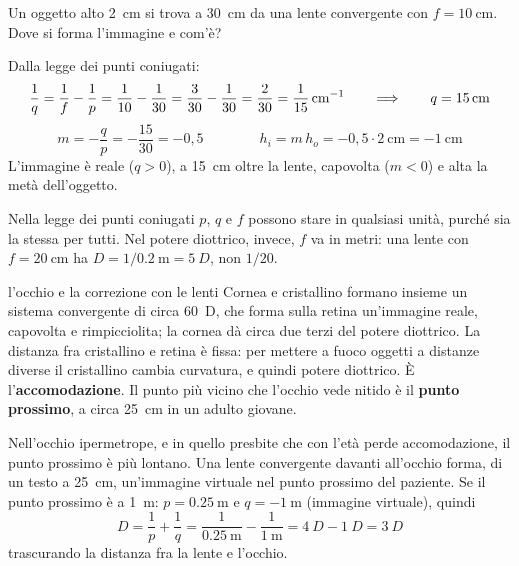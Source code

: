 \begin{esempio}
Un oggetto alto \SI{2}{\centi\metre} si trova a \SI{30}{\centi\metre} da una lente convergente con $f = \SI{10}{\centi\metre}$. Dove si forma l'immagine e com'è?

Dalla legge dei punti coniugati:
\[
  \frac{1}{q} = \frac{1}{f} - \frac{1}{p} = \frac{1}{10} - \frac{1}{30} = \frac{3}{30} - \frac{1}{30} = \frac{2}{30} = \frac{1}{15}\,\si[per-mode=power]{\centi\metre\tothe{-1}}
  \qquad\Longrightarrow\qquad
  q = \SI{15}{\centi\metre}
\]
\[
  m = -\frac{q}{p} = -\frac{15}{30} = -0{,}5
  \qquad\qquad
  h_i = m\,h_o = -0{,}5 \cdot \SI{2}{\centi\metre} = \SI{-1}{\centi\metre}
\]
L'immagine è reale ($q > 0$), a \SI{15}{\centi\metre} oltre la lente, capovolta ($m < 0$) e alta la metà dell'oggetto.
\end{esempio}

\begin{attenzione}
Nella legge dei punti coniugati $p$, $q$ e $f$ possono stare in qualsiasi unità, purché sia la stessa per tutti. Nel potere diottrico, invece, $f$ va in metri: una lente con $f = \SI{20}{\centi\metre}$ ha $D = 1/\SI{0,2}{\metre} = \SI{5}{D}$, non $1/20$.
\end{attenzione}



\begin{applicazione}{l'occhio e la correzione con le lenti}
Cornea e cristallino formano insieme un sistema convergente di circa \SI{60}{D}, che forma sulla retina un'immagine reale, capovolta e rimpicciolita; la cornea dà circa due terzi del potere diottrico. La distanza fra cristallino e retina è fissa: per mettere a fuoco oggetti a distanze diverse il cristallino cambia curvatura, e quindi potere diottrico. È l'\textbf{accomodazione}. Il punto più vicino che l'occhio vede nitido è il \textbf{punto prossimo}, a circa \SI{25}{\centi\metre} in un adulto giovane.

Nell'occhio ipermetrope, e in quello presbite che con l'età perde accomodazione, il punto prossimo è più lontano. Una lente convergente davanti all'occhio forma, di un testo a \SI{25}{\centi\metre}, un'immagine virtuale nel punto prossimo del paziente. Se il punto prossimo è a \SI{1}{\metre}: $p = \SI{0,25}{\metre}$ e $q = \SI{-1}{\metre}$ (immagine virtuale), quindi
\[
  D = \frac{1}{p} + \frac{1}{q} = \frac{1}{\SI{0,25}{\metre}} - \frac{1}{\SI{1}{\metre}} = \SI{4}{D} - \SI{1}{D} = \SI{3}{D}
\]
trascurando la distanza fra la lente e l'occhio.
\end{applicazione}

\riepilogoformule
